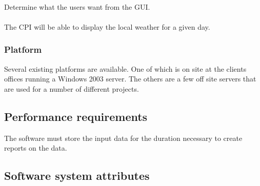 \documentclass[12pt]{article}
\begin{document}
\paragraph{} Determine what the users want from the GUI.
\paragraph{} The CPI will be able to display the local weather for a given day.

\subsubsection{Platform}\label{sec:Platform}
Several existing platforms are available. One of which is on site at the clients offices running a Windows 2003 server. The others are a few off site servers that are used for a number of different projects.

\subsection{Performance requirements}
The software must store the input data for the duration necessary to create reports on the data.

\subsection{Software system attributes}
\end{document}
